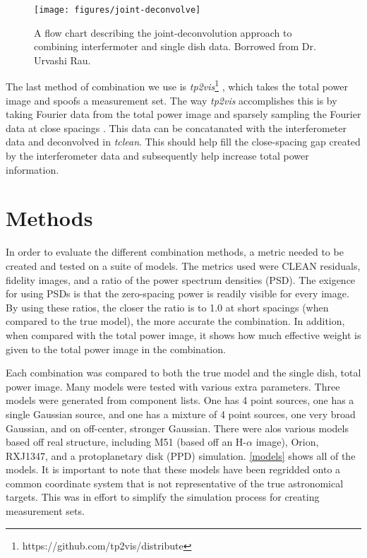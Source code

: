 \documentclass[manuscript,linenumbers]{aastex62}
\begin{document}
\begin{figure*}[t]
    \texttt{[image: figures/joint-deconvolve]}
    \caption{A flow chart describing the joint-deconvolution approach to combining interfermoter and single dish data. Borrowed from Dr. Urvashi Rau.}
    \label{jd-flow}
\end{figure*}

The last method of combination we use is \textit{tp2vis}\footnote{https://github.com/tp2vis/distribute} , which takes the total power image and spoofs a measurement set. The way \textit{tp2vis} accomplishes this is by taking Fourier data from the total power image and sparsely sampling the Fourier data at close spacings \citep[see][]{2011ApJS..193...19K}. This data can be concatanated with the interferometer data and deconvolved in \textit{tclean}. This should help fill the close-spacing gap created by the interferometer data and subsequently help increase total power information.

\section{Methods}

In order to evaluate the different combination methods, a metric needed to be created and tested on a suite of models. The metrics used were CLEAN residuals, fidelity images, and a ratio of the power spectrum densities (PSD). The exigence for using PSDs is that the zero-spacing power is readily visible for every image. By using these ratios, the closer the ratio is to 1.0 at short spacings (when compared to the true model), the more accurate the combination. In addition, when compared with the total power image, it shows how much effective weight is given to the total power image in the combination. 

Each combination was compared to both the true model and the single dish, total power image. Many models were tested with various extra parameters. Three models were generated from component lists. One has 4 point sources, one has a single Gaussian source, and one has a mixture of 4 point sources, one very broad Gaussian, and on off-center, stronger Gaussian. There were alos various models based off real structure, including M51 (based off an H-$\alpha$ image), Orion, RXJ1347, and a protoplanetary disk (PPD) simulation. \autoref{models} shows all of the models. It is important to note that these models have been regridded onto a common coordinate system that is not representative of the true astronomical targets. This was in effort to simplify the simulation process for creating measurement sets. 
\end{document}
